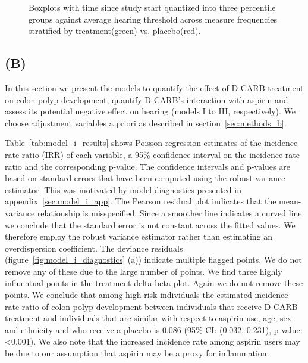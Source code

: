 \documentclass[paper=a4, fontsize=11pt]{scrartcl} %
\numberwithin{equation}{section} %
\numberwithin{figure}{section} %
\numberwithin{table}{section} %
\begin{document}
\begin{figure}[H]
\begin{minipage}[b]{0.38\textwidth}
    \caption{Boxplots with time since study start quantized into three percentile groups against average hearing threshold across measure frequencies stratified by treatment(green) vs. placebo(red).}
    \label{fig:time_boxplot}
  \end{minipage}
\end{figure}

\subsection{(B)}
\label{sec:results_b}
In this section we present the models to quantify the effect of D-CARB treatment on colon polyp development, quantify D-CARB's interaction with aspirin and assess its potential negative effect on hearing (models I to III, respectively). We choose adjustment variables a priori as described in section~\ref{sec:methods_b}.

Table~\ref{tab:model_i_results} shows Poisson regression estimates of the incidence rate ratio (IRR) of each variable, a 95\% confidence interval on the incidence rate ratio and the corresponding p-value. The confidence intervals and p-values are based on standard errors that have been computed using the robust variance estimator.
This was motivated by model diagnostics presented in appendix~\ref{sec:model_i_app}. The Pearson residual plot indicates that the mean-variance relationship is misspecified. Since a smoother line indicates a curved line we conclude that the standard error is not constant across the fitted values. We therefore employ the robust variance estimator rather than estimating an overdispersion coefficient. The deviance residuals (figure~\ref{fig:model_i_diagnostics} (a)) indicate multiple flagged points. We do not remove any of these due to the large number of points. We find three highly influentual points in the treatment delta-beta plot. Again we do not remove these points.
We conclude that among high risk individuals the estimated incidence rate ratio of colon polyp development between individuals that receive D-CARB treatment and individuals that are similar with respect to aspirin use, age, sex and ethnicity and who receive a placebo is 0.086 (95\% CI: (0.032, 0.231), p-value: <0.001). We also note that the increased incidence rate among aspirin users may be due to our assumption that aspirin may be a proxy for inflammation.\\
\end{document}
